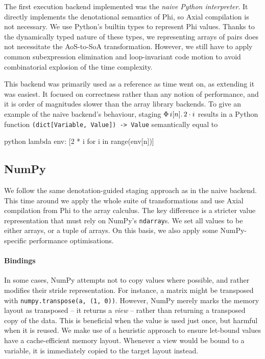 The first execution backend implemented was the \textit{naive Python interpreter}. It directly implements the denotational semantics of Phi, so Axial compilation is not necessary. We use Python's builtin types to represent Phi values. Thanks to the dynamically typed nature of these types, we representing arrays of pairs does not necessitate the AoS-to-SoA transformation. However, we still have to apply common subexpression elimination and loop-invariant code motion to avoid combinatorial explosion of the time complexity.

This backend was primarily used as a reference as time went on, as extending it was easiest. It focused on correctness rather than any notion of performance, and it is order of magnitudes slower than the array library backends. To give an example of the naive backend's behaviour, staging $\Phi\, {i}[{n}] \ldotp {2 \cdot i}$ results in a Python function \texttt{(dict[Variable, Value]) -> Value} semantically equal to
\begin{center}
\begin{cminted}{python}
lambda env: [2 * i for i in range(env[n])]
\end{cminted}    
\end{center}

\subsection{NumPy}

We follow the same denotation-guided staging approach as in the naive backend. This time around we apply the whole suite of transformations and use Axial compilation from Phi to the array calculus. The key difference is a stricter value representation that must rely on NumPy's \texttt{ndarray}s. We set all values to be either arrays, or a tuple of arrays. On this basis, we also apply some NumPy-specific performance optimisations.

\paragraph{Bindings} In some cases, NumPy attempts not to copy values where possible, and rather modifies their stride representation. For instance, a matrix might be transposed with \texttt{numpy.transpose(a, (1, 0))}. However, NumPy merely marks the memory layout as transposed -- it returns a \textit{view} -- rather than returning a transposed copy of the data. This is beneficial when the value is used just once, but harmful when it is reused. We make use of a heuristic approach to ensure let-bound values have a cache-efficient memory layout. Whenever a view would be bound to a variable, it is immediately copied to the target layout instead. 

